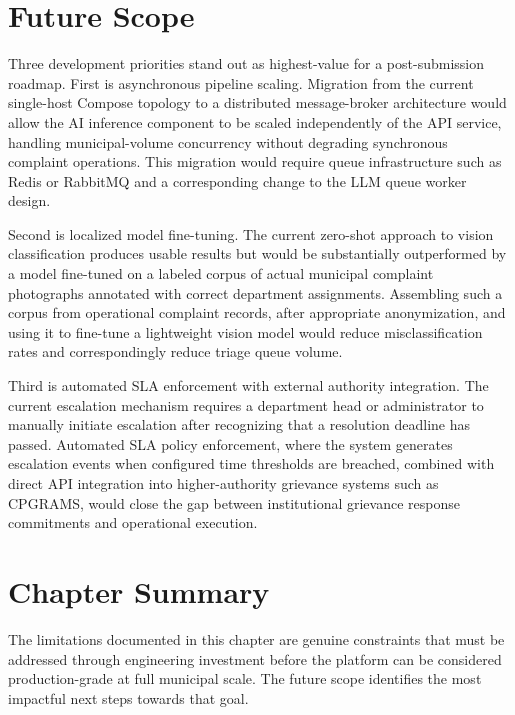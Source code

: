 \section{Future Scope}

Three development priorities stand out as highest-value for a post-submission roadmap. First is asynchronous pipeline scaling. Migration from the current single-host Compose topology to a distributed message-broker architecture would allow the AI inference component to be scaled independently of the API service, handling municipal-volume concurrency without degrading synchronous complaint operations. This migration would require queue infrastructure such as Redis or RabbitMQ and a corresponding change to the LLM queue worker design.

Second is localized model fine-tuning. The current zero-shot approach to vision classification produces usable results but would be substantially outperformed by a model fine-tuned on a labeled corpus of actual municipal complaint photographs annotated with correct department assignments. Assembling such a corpus from operational complaint records, after appropriate anonymization, and using it to fine-tune a lightweight vision model would reduce misclassification rates and correspondingly reduce triage queue volume.

Third is automated SLA enforcement with external authority integration. The current escalation mechanism requires a department head or administrator to manually initiate escalation after recognizing that a resolution deadline has passed. Automated SLA policy enforcement, where the system generates escalation events when configured time thresholds are breached, combined with direct API integration into higher-authority grievance systems such as CPGRAMS, would close the gap between institutional grievance response commitments and operational execution.

\section{Chapter Summary}

The limitations documented in this chapter are genuine constraints that must be addressed through engineering investment before the platform can be considered production-grade at full municipal scale. The future scope identifies the most impactful next steps towards that goal.
